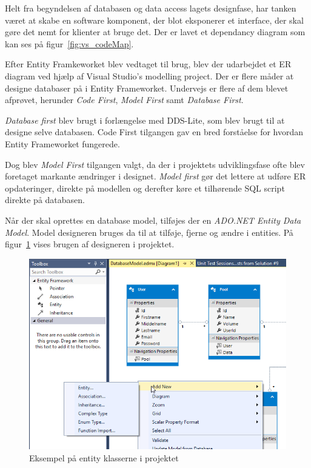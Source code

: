 Helt fra begyndelsen af databasen og data access lagets designfase, har tanken været at skabe en software komponent, der blot eksponerer et interface, der skal gøre det nemt for klienter at bruge det. Der er lavet et dependancy diagram som kan ses på figur~\ref{fig:vs_codeMap}.

Efter Entity Framkeworket blev vedtaget til brug, blev der udarbejdet et ER diagram ved hjælp af Visual Studio's modelling project. Der er flere måder at designe databaser på i Entity Frameworket. Undervejs er flere af dem blevet afprøvet, herunder \textit{Code First}, \textit{Model First} samt \textit{Database First}.

\textit{Database first} blev brugt i forlængelse med DDS-Lite, som blev brugt til at designe selve databasen. Code First tilgangen gav en bred forståelse for hvordan Entity Frameworket fungerede.

Dog blev \textit{Model First} tilgangen valgt, da der i projektets udviklingsfase ofte blev foretaget markante ændringer i designet. \textit{Model first} gør det lettere at udføre ER opdateringer, direkte på modellen og derefter køre et tilhørende SQL script direkte på databasen. 

Når der skal oprettes en database model, tilføjes der en \textit{ADO.NET Entity Data Model}. Model designeren bruges da til at tilføje, fjerne og ændre i entities.
På figur~\ref{fig:modelDesigner} vises brugen af designeren i projektet.

\begin{figure}
	\centering
	\includegraphics[width=\linewidth]{figs/modelDesigner}
	\caption{Eksempel på entity klasserne i projektet}
	\label{fig:modelDesigner}
\end{figure}

